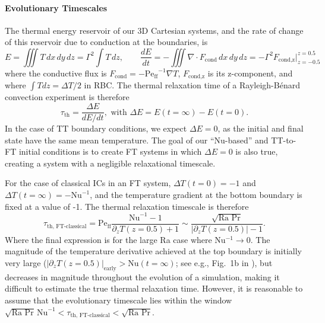 \documentclass[aps, pre, onecolumn, nofootinbib, notitlepage, groupedaddress, amsfonts, amssymb, amsmath, longbibliography, superscriptaddress]{revtex4-1}
\newcommand{\grad}{\ensuremath{\nabla}}
\newcommand{\RB}{Rayleigh-B\'{e}nard }
\newcommand{\Peff}{\ensuremath{\text{Pe}_{\text{ff}}}}
\newcommand{\ea}[1]{{\color{red} #1}}
\begin{document}
\ea{
\paragraph{Evolutionary Timescales}
The thermal energy reservoir of our 3D Cartesian systems, and the rate of change of this reservoir due to conduction at the boundaries, is
\begin{equation}
E = \iiint T\,dx\,dy\,dz = \Gamma^2 \int T\,dz,
\qquad
\frac{dE}{dt} = -\iiint \grad\cdot F_{\text{cond}}\,dx\,dy\,dz = -\Gamma^2 F_{\text{cond,z}}\bigg|_{z=-0.5}^{z=0.5}
\end{equation}
where the conductive flux is $F_{\text{cond}} = -\Peff^{-1}\grad T$, $F_{\text{cond,z}}$ is its z-component, and where $\int T dz = \Delta T / 2$ in RBC.
The thermal relaxation time of a \RB convection experiment is therefore
\begin{equation}
\tau_{\text{th}} = \frac{\Delta E}{dE/dt},
\,\,\text{with}\,\,
\Delta E = E(t=\infty) - E(t=0).
\end{equation}
In the case of TT boundary conditions, we expect $\Delta E = 0$, as the initial and final state have the same mean temperature.
The goal of our ``Nu-based'' and TT-to-FT initial conditions is to create FT systems in which $\Delta E = 0$ is also true, creating a system with a negligible relaxational timescale.

For the case of classical ICs in an FT system, $\Delta T(t=0) = -1$ and $\Delta T(t=\infty) = -\text{Nu}^{-1}$, and the temperature gradient at the bottom boundary is fixed at a value of -1.
The thermal relaxation timescale is therefore
\begin{equation}
\tau_{\text{th, FT-classical}} = \Peff \frac{\text{Nu}^{-1} - 1}{\partial_z T(z=0.5) + 1} \sim \frac{\sqrt{\text{Ra Pr}}}{|\partial_z T(z = 0.5)| - 1}.
\end{equation}
Where the final expression is for the large Ra case where Nu$^{-1} \rightarrow 0$.
The magnitude of the temperature derivative achieved at the top boundary is initially very large ($|\partial_z T(z=0.5)|_{\text{early}} > \text{Nu}(t=\infty)$; see e.g., Fig.~1b in \cite{anders&all2018}), but decreases in magnitude throughout the evolution of a simulation, making it difficult to estimate the true thermal relaxation time.
However, it is reasonable to assume that the evolutionary timescale lies within the window $\sqrt{\text{Ra Pr}} \,\text{Nu}^{-1} < \tau_{\text{th, FT-classical}} < \sqrt{\text{Ra Pr}}$.



}
\end{document}
